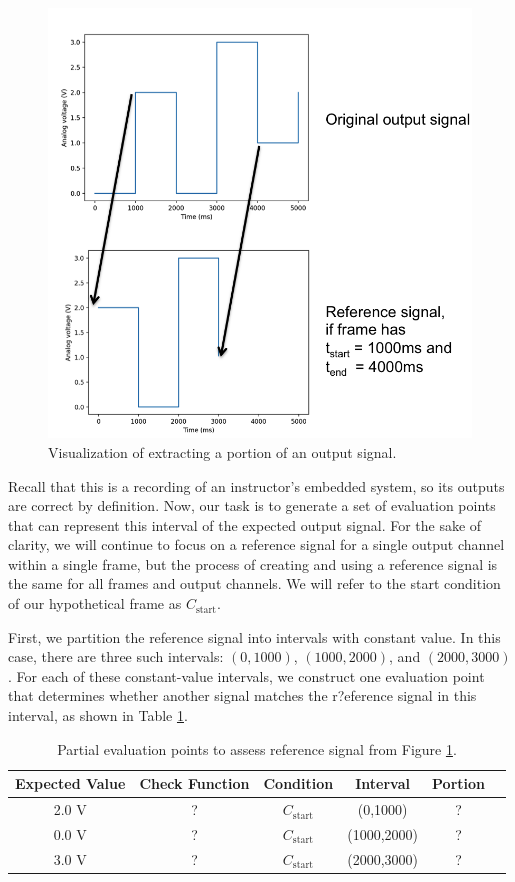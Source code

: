 \documentclass[12pt]{article}
\begin{document}
\begin{figure}[ht]
\centering
\includegraphics[width=0.6\linewidth]{output-framing.png}
\caption{Visualization of extracting a portion of an output signal.}
\label{fig:output-framing}
\end{figure}

Recall that this is a recording of an instructor's embedded system, so its outputs are correct by definition.  Now, our task is to generate a set of evaluation points that can represent this interval of the expected output signal.  For the sake of clarity, we will continue to focus on a reference signal for a single output channel within a single frame, but the process of creating and using a reference signal is the same for all frames and output channels.  We will refer to the start condition of our hypothetical frame as $C_{\text{start}}$.

First, we partition the reference signal into intervals with constant value.  In this case, there are three such intervals: $(0,1000)$, $(1000,2000)$, and $(2000,3000)$.  For each of these constant-value intervals, we construct one evaluation point that determines whether another signal matches the r?eference signal in this interval, as shown in Table \ref{table:construct-points}.

\begin{table}[ht]
\begin{center}
\caption{Partial evaluation points to assess reference signal from Figure \ref{fig:output-framing}.}
\vspace{2mm}
\label{table:construct-points}
\begin{tabular}{cccccc}
Expected Value & Check Function & Condition & Interval & Portion \\ \hline
2.0 V & ? & $C_{\text{start}}$ & (0,1000) & ? \\
0.0 V & ? & $C_{\text{start}}$ & (1000,2000) & ? \\
3.0 V & ? & $C_{\text{start}}$ & (2000,3000) & ? \\ \hline
\end{tabular}
\end{center}
\end{table}
\end{document}
